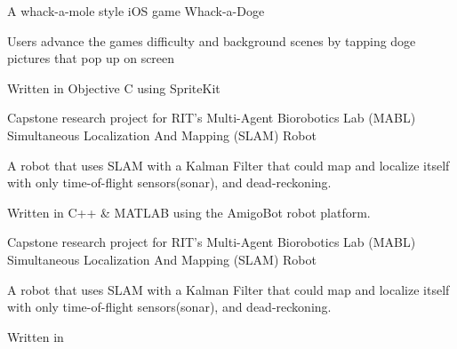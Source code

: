 \begin{cventries}

    \cventry
      {A whack-a-mole style iOS game}
      {Whack-a-Doge}
      {}
      {}
      {
        \begin{cvitems}
          \item {Users advance the games difficulty and background scenes by tapping doge pictures that pop up on screen}
          \item {Written in Objective C using SpriteKit}
        \end{cvitems}
      }


    \cventry
      {Capstone research project for RIT's Multi-Agent Biorobotics Lab (MABL)}
      {Simultaneous Localization And Mapping (SLAM) Robot}
      {}
      {}
      {
        \begin{cvitems}
          \item {A robot that uses SLAM with a Kalman Filter that could map and localize itself with only time-of-flight sensors(sonar), and dead-reckoning.}
          \item {Written in C++ \& MATLAB using the AmigoBot robot platform.}
          \end{cvitems}
      }

    \cventry
      {Capstone research project for RIT's Multi-Agent Biorobotics Lab (MABL)}
      {Simultaneous Localization And Mapping (SLAM) Robot}
      {} %
      {} %
      {
        \begin{cvitems}
          \item {A robot that uses SLAM with a Kalman Filter that could map and localize itself with only time-of-flight sensors(sonar), and dead-reckoning.}
          \item {Written in }
        \end{cvitems}
      }


\end{cventries}

